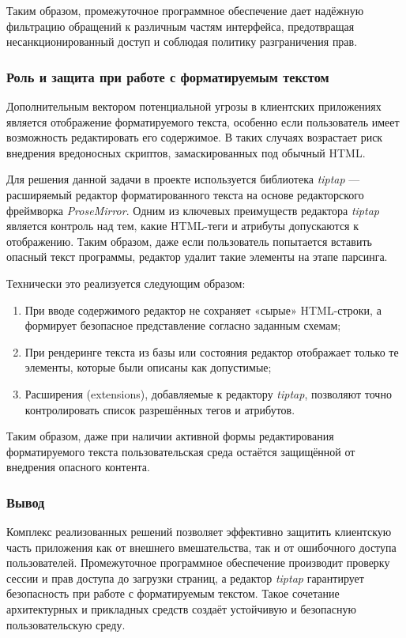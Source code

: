 Таким образом, промежуточное программное обеспечение дает надёжную фильтрацию обращений к различным частям интерфейса, предотвращая несанкционированный доступ и соблюдая политику разграничения прав.

\subsubsection{Роль и защита при работе с форматируемым текстом}
Дополнительным вектором потенциальной угрозы в клиентских приложениях является отображение форматируемого текста, особенно если пользователь имеет возможность редактировать его содержимое. В таких случаях возрастает риск внедрения вредоносных скриптов, замаскированных под обычный HTML.

Для решения данной задачи в проекте используется библиотека \textit{tiptap} — расширяемый редактор форматированного текста на основе редакторского фреймворка  \textit{ProseMirror}. Одним из ключевых преимуществ редактора \textit{tiptap} является контроль над тем, какие HTML-теги и атрибуты допускаются к отображению. Таким образом, даже если пользователь попытается вставить опасный текст программы, редактор удалит такие элементы на этапе парсинга.

Технически это реализуется следующим образом:
\begin{enumerate}
  \item При вводе содержимого редактор не сохраняет «сырые» HTML-строки, а формирует безопасное представление согласно заданным схемам;
  \item При рендеринге текста из базы или состояния редактор отображает только те элементы, которые были описаны как допустимые;
  \item Расширения (extensions), добавляемые к редактору \textit{tiptap}, позволяют точно контролировать список разрешённых тегов и атрибутов.
\end{enumerate}

Таким образом, даже при наличии активной формы редактирования форматируемого текста пользовательская среда остаётся защищённой от внедрения опасного контента.

\subsubsection{Вывод}

Комплекс реализованных решений позволяет эффективно защитить клиентскую часть приложения как от внешнего вмешательства, так и от ошибочного доступа пользователей. Промежуточное программное обеспечение производит проверку сессии и прав доступа до загрузки страниц, а редактор \textit{tiptap} гарантирует безопасность при работе с форматируемым текстом. Такое сочетание архитектурных и прикладных средств создаёт устойчивую и безопасную пользовательскую среду.
